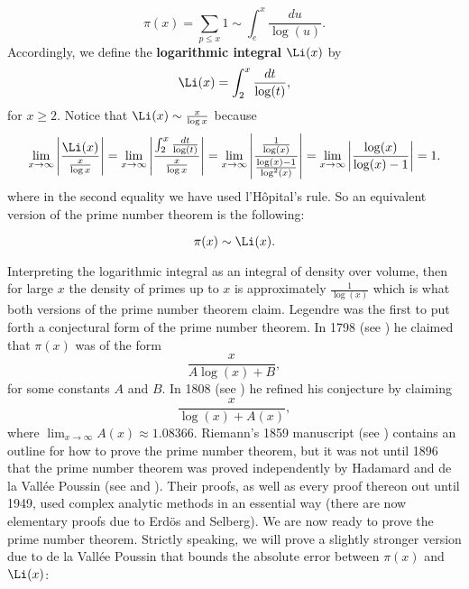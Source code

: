       \[
        \pi(x) = \sum_{p \le x}1 \sim \int_{e}^{x}\frac{du}{\log(u)}.
      \]
      Accordingly, we define the \textbf{logarithmic integral} $\Li(x)$ by
      \[
        \Li(x) = \int_{2}^{x}\frac{dt}{\log(t)},
      \]
      for $x \ge 2$. Notice that $\Li(x) \sim \frac{x}{\log{x}}$ because
      \[
        \lim_{x \to \infty}\left|\frac{\Li(x)}{\frac{x}{\log{x}}}\right| = \lim_{x \to \infty}\left|\frac{\int_{2}^{x}\frac{dt}{\log(t)}}{\frac{x}{\log{x}}}\right| = \lim_{x \to \infty}\left|\frac{\frac{1}{\log(x)}}{\frac{\log(x)-1}{\log^{2}(x)}}\right| = \lim_{x \to \infty}\left|\frac{\log(x)}{\log(x)-1}\right| = 1.
      \]
      where in the second equality we have used  l'H\^opital's rule. So an equivalent version of the prime number theorem is the following:
      \begin{theorem}
        \phantom{ }
        \[
          \pi(x) \sim \Li(x).
        \]
      \end{theorem}
      Interpreting the logarithmic integral as an integral of density over volume, then for large $x$ the density of primes up to $x$ is approximately $\frac{1}{\log(x)}$ which is what both versions of the prime number theorem claim. Legendre was the first to put forth a conjectural form of the prime number theorem. In 1798 (see \cite{legendre1798essai}) he claimed that $\pi(x)$ was of the form
      \[
        \frac{x}{A\log(x)+B},
      \]
      for some constants $A$ and $B$. In 1808 (see \cite{legendre1808essai}) he refined his conjecture by claiming
      \[
        \frac{x}{\log(x)+A(x)},
      \]
      where $\lim_{x \to \infty}A(x) \approx 1.08366$. Riemann's 1859 manuscript (see \cite{riemann1859ueber}) contains an outline for how to prove the prime number theorem, but it was not until 1896 that the prime number theorem was proved independently by Hadamard and de la Vall\'ee Poussin (see \cite{hadamard1896distribution} and \cite{poussin1897recherches}). Their proofs, as well as every proof thereon out until 1949, used complex analytic methods in an essential way (there are now elementary proofs due to Erd\"os and Selberg). We are now ready to prove the prime number theorem. Strictly speaking, we will prove a slightly stronger version due to de la Vall\'ee Poussin that bounds the absolute error between $\pi(x)$ and $\Li(x)$:


